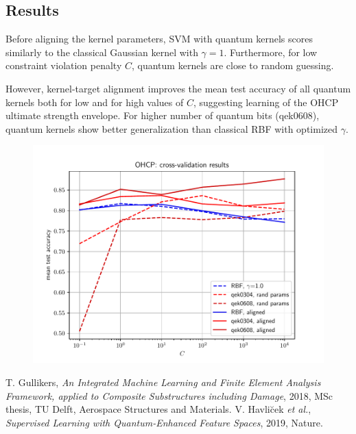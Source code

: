 \documentclass[9pt,a4paper]{extarticle}
\begin{document}
\begin{multicols}{2}
\section{Results}

Before aligning the kernel parameters, SVM with quantum kernels scores similarly to the classical Gaussian kernel with $\gamma=1$. Furthermore, for low constraint violation penalty $C$, quantum kernels are close to random guessing.

However, kernel-target alignment improves the mean test accuracy of all quantum kernels both for low and for high values of $C$, suggesting learning of the OHCP ultimate strength envelope. For higher number of quantum bits (qek0608), quantum kernels show better generalization than classical RBF with optimized $\gamma$.

\begin{figure}[H]
    \centering
    \includegraphics[width=.45\textwidth]{pics/cv-accuracy.pdf}
\end{figure}


\begin{thebibliography}{99}
    T. Gullikers, \emph{An Integrated Machine Learning and Finite
    Element Analysis Framework, applied to
    Composite Substructures including Damage}, 2018, MSc thesis, TU Delft, Aerospace Structures and Materials.
    V. Havli\u{c}ek \emph{et al.}, \emph{Supervised Learning with Quantum-Enhanced Feature Spaces}, 2019, Nature.
\end{thebibliography}

\end{multicols}
\end{document}
